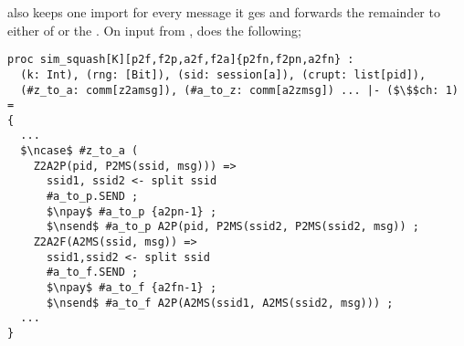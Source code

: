  also keeps one import for every message it ges and forwards the remainder to either of \F or the \partywrapper.
On input from \Z,  does the following; 

\begin{lstlisting}[basicstyle=\footnotesize\BeraMonottFamily, frame=single, mathescape]
proc sim_squash[K][p2f,f2p,a2f,f2a]{p2fn,f2pn,a2fn} :
  (k: Int), (rng: [Bit]), (sid: session[a]), (crupt: list[pid]),
  (#z_to_a: comm[z2amsg]), (#a_to_z: comm[a2zmsg]) ... |- ($\$$ch: 1) =
{
  ...
  $\ncase$ #z_to_a (
    Z2A2P(pid, P2MS(ssid, msg))) =>
      ssid1, ssid2 <- split ssid
      #a_to_p.SEND ;
      $\npay$ #a_to_p {a2pn-1} ;
      $\nsend$ #a_to_p A2P(pid, P2MS(ssid2, P2MS(ssid2, msg)) ;
    Z2A2F(A2MS(ssid, msg)) =>
      ssid1,ssid2 <- split ssid
      #a_to_f.SEND ; 
      $\npay$ #a_to_f {a2fn-1} ;
	  $\nsend$ #a_to_f A2P(A2MS(ssid1, A2MS(ssid2, msg))) ;
  ...
}	  
\end{lstlisting}
